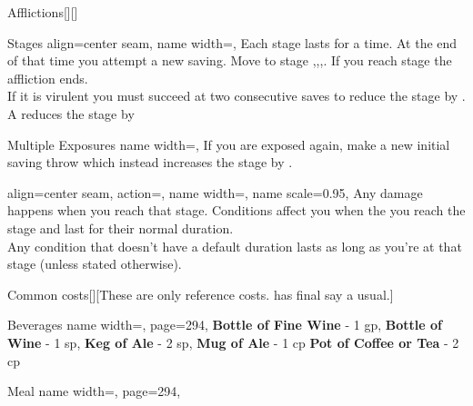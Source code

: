 \begin{PageBack}
\begin{Tables}{\backTableHeight}
\begin{Table}{Afflictions}[][]
            \begin{entry}{Stages}{%
                align=center seam,
                name width=\turnLength,}
                Each stage lasts for a time. At the end of that time you attempt a new
                saving. Move to stage ,,,. If you reach
                stage  the affliction ends.\\
                If it is virulent you must succeed at two consecutive saves to reduce the stage by . A  reduces the stage by 
            \end{entry}
            \begin{entry}{Multiple Exposures}{%
                name width=\turnLength,}
                If you are exposed again, make a new initial saving throw which instead
                increases the stage by  .
            \end{entry}
            \begin{entry}{}{%
                align=center seam,
                action={\BodyFont{}},
                name width=\turnLength,%
                name scale=0.95,
            }
                Any damage happens when you reach that stage. Conditions affect you when the you reach the
                stage and last for their normal duration.\\
                Any condition that doesn't have a default duration lasts as long as you're at that stage {(unless
                stated otherwise)}.
            \end{entry}
        \end{Table}\TableSpace
        \begin{Table}{Common costs}[][These are only reference costs. \GM has final say a usual.]
            \begin{entry}{Beverages }{%
                name width=\turnLength,%
                page=294,
            }
                \textbf{Bottle of Fine Wine} - 1 gp, \quad
                \textbf{Bottle of Wine} - 1 sp, \quad
                \textbf{Keg of Ale} - 2 sp, \quad
                \textbf{Mug of Ale} - 1 cp \quad
                \textbf{Pot of Coffee or Tea} - 2 cp\quad
            \end{entry}
            \begin{entry}{Meal}{%
                name width=\turnLength,%
                page=294,
            }

\end{entry}
\end{Table}
\end{Tables}
\end{PageBack}
